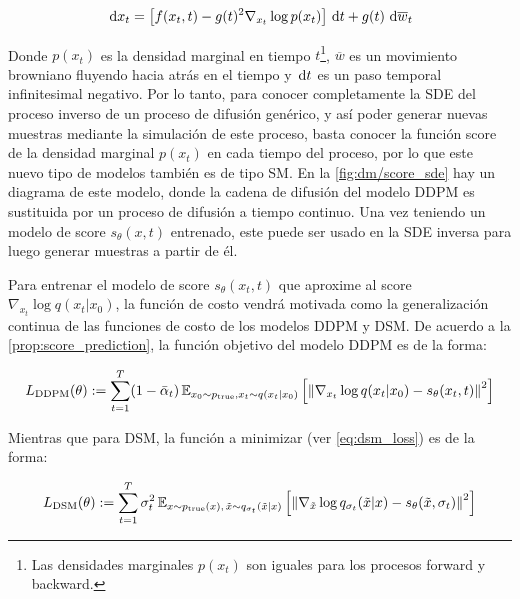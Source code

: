 \begin{equation}
    \label{eq:score_reverse_sde}
    \,\operatorname{d}\! x_t = \left[f(x_t,t)-g(t)^2 \nabla_{x_t} \log p(x_t)\right]\,\operatorname{d}\! t + g(t)\,\operatorname{d}\!\overline{w}_t
\end{equation}

Donde $p(x_t)$ es la densidad marginal en tiempo $t$\footnote{Las densidades marginales $p(x_t)$ son iguales para los procesos forward y backward.}, $\overline{w}$ es un movimiento browniano fluyendo hacia atrás en el tiempo y $\,\operatorname{d}\! t$ es un paso temporal infinitesimal negativo. Por lo tanto, para conocer completamente la SDE del proceso inverso de un proceso de difusión genérico, y así poder generar nuevas muestras mediante la simulación de este proceso, basta conocer la función score de la densidad marginal $p(x_t)$ en cada tiempo del proceso, por lo que este nuevo tipo de modelos también es de tipo SM. En la \autoref{fig:dm/score_sde} hay un diagrama de este modelo, donde la cadena de difusión del modelo DDPM es sustituida por un proceso de difusión a tiempo continuo. Una vez teniendo un modelo de score $s_\theta(x,t)$ entrenado, este puede ser usado en la SDE inversa para luego generar muestras a partir de él.


Para  entrenar el modelo de score $s_\theta(x_t,t)$ que aproxime al score $\nabla_{x_t}\log q(x_t|x_0)$, la función de costo vendrá motivada como la generalización continua de las funciones de costo de los modelos DDPM y DSM. De acuerdo a la \autoref{prop:score_prediction}, la función objetivo del modelo DDPM es de la forma:

\begin{equation*}
    L_{\text{DDPM}}(\theta) := \sum_{t=1}^T (1-\bar\alpha_t)\,\mathbb{E}_{x_0\sim p_{\operatorname{true}}, x_t\sim q(x_t|x_0)}\left[\left\lVert \nabla_{x_t}\log q(x_t|x_0) - s_\theta(x_t,t) \right\rVert^2\right]
\end{equation*}

Mientras que para DSM, la función a minimizar (ver \eqref{eq:dsm_loss}) es de la forma:

\begin{align*}
    L_{\text{DSM}}(\theta) := \sum_{t=1}^T \sigma_t^2 \,\mathbb{E}_{x\sim p_{\operatorname{true}}(x),\,\tilde{x}\sim q_{\sigma_t}(\tilde{x}|x)}\left[\left\lVert \nabla_{\tilde{x}}\log q_{\sigma_t}(\tilde{x}|x) - s_\theta(\tilde{x}, \sigma_t) \right\rVert^2\right]
\end{align*}


